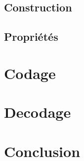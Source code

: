 \documentclass{article}
\begin{document}
\subsection{Construction}

\subsection{Propriétés}

\section{Codage}

\section{Decodage}

\section{Conclusion}
\end{document}
